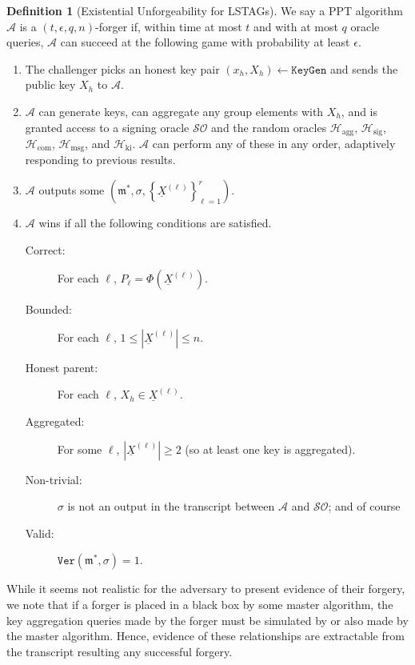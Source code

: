 \documentclass{mrl}
\theoremstyle{definition}
\numberwithin{theorem}{subsection}
\newtheorem{defn}[theorem]{Definition}
\newcommand{\adversary}{\mathcal{A}}
\newcommand{\m}{\mathfrak{m}}
\begin{document}
\begin{defn}[Existential Unforgeability for LSTAGs]\label{game}
We say a PPT algorithm $\adversary$ is a $(t, \epsilon, q,n)$-forger if, within time at most $t$ and with at most $q$ oracle queries, $\adversary$ can succeed at the following game with probability at least $\epsilon$.
\begin{enumerate}
\item The challenger picks an honest key pair $(x_h,X_h) \leftarrow \texttt{KeyGen}$ and sends the public key $X_h$ to $\adversary.$

\item $\adversary$ can generate keys, can aggregate any group elements with $X_h$, and is granted access to a signing oracle $\mathcal{SO}$ and the random oracles $\mathcal{H}_{\text{agg}}$, $\mathcal{H}_{\text{sig}}$, $\mathcal{H}_{\text{com}}$, $\mathcal{H}_{\text{msg}}$, and $\mathcal{H}_{\text{ki}}$. $\adversary$ can perform any of these in any order, adaptively responding to previous results.

\item $\adversary$ outputs some $(\m^*, \sigma, \left\{\underline{X}^{(\ell)}\right\}_{\ell = 1}^r)$.

\item $\adversary$ wins if all the following conditions are satisfied. 

\begin{description}
\item [Correct:] For each $\ell$, $P_\ell = \Phi(\underline{X}^{(\ell)})$.
\item [Bounded:] For each $\ell$, $1 \leq \left|\underline{X}^{(\ell)}\right| \leq n$.
\item [Honest parent:] For each $\ell$, $X_h \in \underline{X}^{(\ell)}$.
\item [Aggregated: ] For some $\ell$, $\left|\underline{X}^{(\ell)}\right| \geq 2$ (so at least one key is aggregated).
\item [Non-trivial: ] $\sigma$ is not an output in the transcript between $\mathcal{A}$ and $\mathcal{SO}$; and of course
\item [Valid: ] $\texttt{Ver}(\m^*, \sigma) = 1$.
\end{description}

\end{enumerate}

\end{defn}

While it seems not realistic for the adversary to present evidence of their forgery, we note that if a forger is placed in a black box by some master algorithm, the key aggregation queries made by the forger must be simulated by or also made by the master algorithm. Hence, evidence of these relationships are extractable from the transcript resulting any successful forgery.
\end{document}
